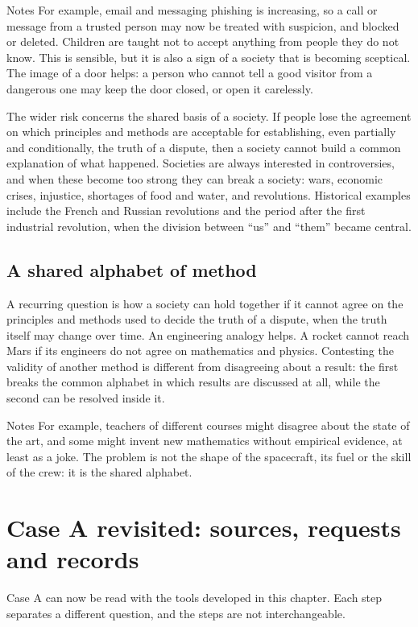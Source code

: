 \begin{nota}{Notes}
	For example, email and messaging phishing is increasing, so a call or message from a trusted person may now be treated with suspicion, and blocked or deleted. Children are taught not to accept anything from people they do not know. This is sensible, but it is also a sign of a society that is becoming sceptical. The image of a door helps: a person who cannot tell a good visitor from a dangerous one may keep the door closed, or open it carelessly.
\end{nota}

The wider risk concerns the shared basis of a society. If people lose the agreement on which principles and methods are acceptable for establishing, even partially and conditionally, the truth of a dispute, then a society cannot build a common explanation of what happened. Societies are always interested in controversies, and when these become too strong they can break a society: wars, economic crises, injustice, shortages of food and water, and revolutions. Historical examples include the French and Russian revolutions and the period after the first industrial revolution, when the division between ``us'' and ``them'' became central.

\subsection{A shared alphabet of method}
A recurring question is how a society can hold together if it cannot agree on the principles and methods used to decide the truth of a dispute, when the truth itself may change over time. An engineering analogy helps. A rocket cannot reach Mars if its engineers do not agree on mathematics and physics. Contesting the validity of another method is different from disagreeing about a result: the first breaks the common alphabet in which results are discussed at all, while the second can be resolved inside it.

\begin{nota}{Notes}
	For example, teachers of different courses might disagree about the state of the art, and some might invent new mathematics without empirical evidence, at least as a joke. The problem is not the shape of the spacecraft, its fuel or the skill of the crew: it is the shared alphabet.
\end{nota}

\section{Case A revisited: sources, requests and records}
Case A can now be read with the tools developed in this chapter. Each step separates a different question, and the steps are not interchangeable.

